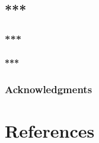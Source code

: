 \documentclass{article}
\begin{document}
\subsection{***}


\subsubsection{***}


\paragraph{***}



\subsubsection*{Acknowledgments}


\section*{References}

\end{document}

